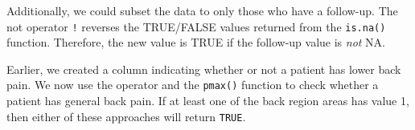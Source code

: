 \documentclass[
  letterpaper,
]{latex/krantz}
\makeatletter
\newenvironment{Shaded}{\begin{snugshade}}{\end{snugshade}}
\newcommand{\DecValTok}[1]{\textcolor[rgb]{0.68,0.00,0.00}{#1}}
\newcommand{\FunctionTok}[1]{\textcolor[rgb]{0.28,0.35,0.67}{#1}}
\newcommand{\NormalTok}[1]{\textcolor[rgb]{0.00,0.23,0.31}{#1}}
\newcommand{\OtherTok}[1]{\textcolor[rgb]{0.00,0.23,0.31}{#1}}
\newcommand{\SpecialCharTok}[1]{\textcolor[rgb]{0.37,0.37,0.37}{#1}}
\newenvironment{kframe}{%
\medskip{}
\setlength{\fboxsep}{.8em}
 \def\at@end@of@kframe{}%
 \ifinner\ifhmode%
  \def\at@end@of@kframe{\end{minipage}}%
  \begin{minipage}{\columnwidth}%
 \fi\fi%
 \def\FrameCommand##1{\hskip\@totalleftmargin \hskip-\fboxsep
 \colorbox{shadecolor}{##1}\hskip-\fboxsep
     \hskip-\linewidth \hskip-\@totalleftmargin \hskip\columnwidth}%
 \MakeFramed {\advance\hsize-\width
   \@totalleftmargin\z@ \linewidth\hsize
   \@setminipage}}%
 {\par\unskip\endMakeFramed%
 \at@end@of@kframe}
\renewenvironment{Shaded}{\begin{kframe}}{\end{kframe}}
\makeatother
\begin{document}
Additionally, we could subset the data to only those who have a
follow-up. The not operator \texttt{!} reverses the TRUE/FALSE values
returned from the \texttt{is.na()} function. Therefore, the new value is
TRUE if the follow-up value is \emph{not} NA.

\begin{Shaded}
\end{Shaded}

Earlier, we created a column indicating whether or not a patient has
lower back pain. We now use the \texttt{\textbar{}} operator and the
\texttt{pmax()} function to check whether a patient has general back
pain. If at least one of the back region areas has value 1, then either
of these approaches will return \texttt{TRUE}.

\begin{Shaded}
\end{Shaded}
\end{document}
